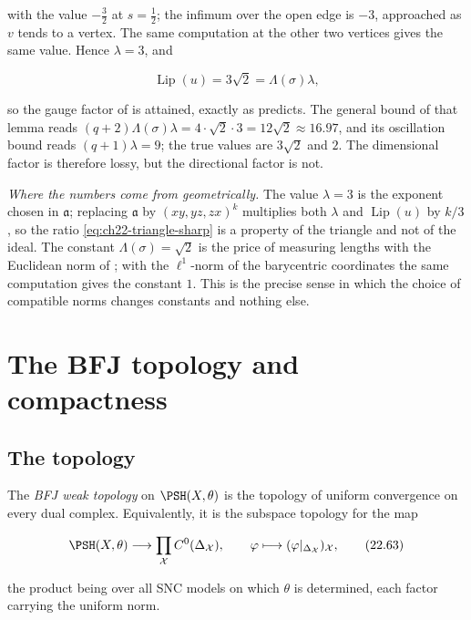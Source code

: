 \begin{example}
with the value \(-\tfrac32\) at \(s=\tfrac12\); the infimum over the open
edge is \(-3\), approached as \(v\) tends to a vertex.  The same computation
at the other two vertices gives the same value.  Hence
\(\lambda=3\), and

\[
 \operatorname{Lip}(u)=3\sqrt2=\Lambda(\sigma)\lambda ,
\tag{22.62}\label{eq:ch22-triangle-sharp}
\]

so the gauge factor of  is attained, exactly as
 predicts.  The general bound of that lemma
reads \((q+2)\Lambda(\sigma)\lambda=4\cdot\sqrt2\cdot3=12\sqrt2\approx16.97\),
and its oscillation bound reads \((q+1)\lambda=9\); the true values are
\(3\sqrt2\) and \(2\).  The dimensional factor is therefore lossy, but the
directional factor is not.

\emph{Where the numbers come from geometrically.}  The value \(\lambda=3\)
is the exponent chosen in \(\mathfrak a\); replacing
\(\mathfrak a\) by \((xy,yz,zx)^k\) multiplies both \(\lambda\) and
\(\operatorname{Lip}(u)\) by \(k/3\), so the ratio
\eqref{eq:ch22-triangle-sharp} is a property of the triangle and not of the
ideal.  The constant \(\Lambda(\sigma)=\sqrt2\) is the price of measuring
lengths with the Euclidean norm of
; with the \(\ell^1\)-norm of the barycentric
coordinates the same computation gives the constant \(1\).  This is the
precise sense in which the choice of compatible norms changes constants and
nothing else.
\end{example}

\section{The BFJ topology and compactness}
\label{sec:ch22-topology}

\subsection{The topology}

\begin{definition}\label{def:ch22-bfj-topology}
The \emph{BFJ weak topology} on \(\PSH(X,\theta)\) is the topology of uniform
convergence on every dual complex.  Equivalently, it is the subspace
topology for the map

\[
 \PSH(X,\theta)\longrightarrow
 \prod_{\mathcal X}C^0(\Delta_{\mathcal X}),
 \qquad
 \varphi\longmapsto
       (\varphi|_{\Delta_{\mathcal X}})_{\mathcal X},
\tag{22.63}\label{eq:ch22-product-embedding}
\]

the product being over all SNC models on which \(\theta\) is determined,
each factor carrying the uniform norm.
\end{definition}

